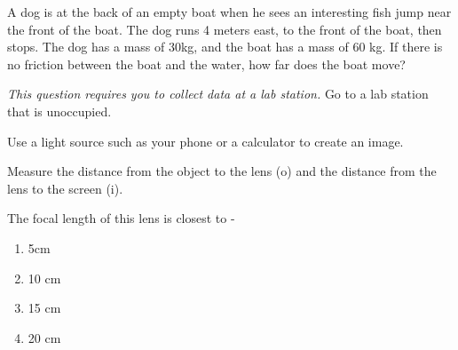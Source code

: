 \documentclass[10pt]{examdesign}
\begin{document}
\begin{multiplechoice} [title={Multiple Choice (5 Points Each)},
	rearrange=yes]
\begin{block}
\end{block}






\begin{question}
	A dog is at the back of an empty boat when he sees an interesting fish jump near the front of the boat.  The dog runs 4 meters east, to the front of the boat, then stops.  The dog has a mass of 30kg, and the boat has a mass of 60 kg.  If there is no friction between the boat and the water, how far does the boat move? 
\end{question}

\end{multiplechoice}


\begin{shortanswer}[title={Lab Question (10 Points)}, rearrange=NO ]
	
	

		\textit{This question requires you to collect data at a lab station.}  Go to a lab station that is unoccupied. \vspace{0.1in}
		
		Use a light source such as your phone or a calculator to create an image.  
		
		\vspace {0.1in} Measure the distance from the object to the lens (o) and the distance from the lens to the screen (i). 
		
	\begin{question}		The focal length of this lens is closest to - 
		\begin{enumerate}
			\item 5cm
			\item 10 cm
			\item 15 cm
			\item 20 cm
	
		\end{enumerate} 
	
	\end{question}
	

	
\end{shortanswer}
\end{document}
